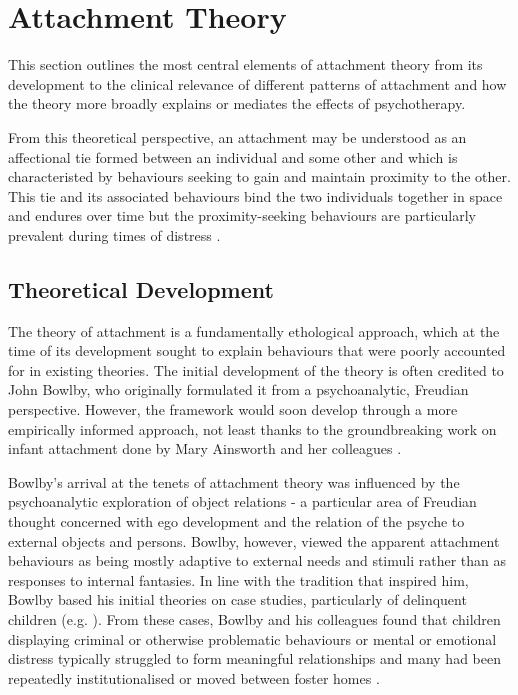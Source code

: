 \documentclass[12pt]{report}
\begin{document}
\section{Attachment Theory}
This section outlines the most central elements of attachment theory from its development to the clinical relevance of different patterns of attachment and how the theory more broadly explains or mediates the effects of psychotherapy.

From this theoretical perspective, an attachment may be understood as an affectional tie formed between an individual and some other and which is characteristed by behaviours seeking to gain and maintain proximity to the other. This tie and its associated behaviours bind the two individuals together in space and endures over time but the proximity-seeking behaviours are particularly prevalent during times of distress \cite{Ainsworth1970,Bowlby1988}.

\subsection{Theoretical Development}
The theory of attachment is a fundamentally ethological approach, which at the time of its development sought to explain behaviours that were poorly accounted for in existing theories. The initial development of the theory is often credited to John Bowlby, who originally formulated it from a psychoanalytic, Freudian perspective. However, the framework would soon develop through a more empirically informed approach, not least thanks to the groundbreaking work on infant attachment done by Mary Ainsworth and her colleagues \cite{Ainsworth1970}.

Bowlby's arrival at the tenets of attachment theory was influenced by the psychoanalytic exploration of object relations - a particular area of Freudian thought concerned with ego development and the relation of the psyche to external objects and persons. Bowlby, however, viewed the apparent attachment behaviours as being mostly adaptive to external needs and stimuli rather than as responses to internal fantasies. In line with the tradition that inspired him, Bowlby based his initial theories on case studies, particularly of delinquent children (e.g. \cite{bowlby1946thieves}). From these cases, Bowlby and his colleagues found that children displaying criminal or otherwise problematic behaviours or mental or emotional distress typically struggled to form meaningful relationships and many had been repeatedly institutionalised or moved between foster homes \cite{bowlby1951WHO}.
\end{document}
